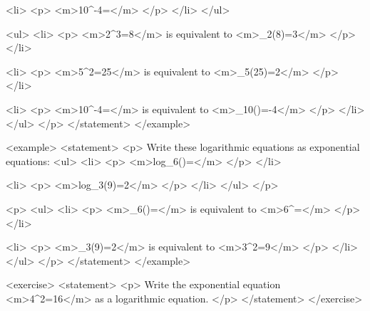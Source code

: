                         <li>
                            <p>
                                <m>10^{-4}=</m>
                            </p>
                        </li>
                    </ul>

                    <ul>
                        <li>
                            <p>
                                <m>2^{3}=8</m> is equivalent to <m>\log_{2}⁡(8)=3</m>
                            </p>
                        </li>

                        <li>
                            <p>
                                <m>5^{2}=25</m> is equivalent to <m>\log_{5}⁡(25)=2</m>
                            </p>
                        </li>

                        <li>
                            <p>
                                <m>10^{-4}=</m> is equivalent to <m>\log_{10}⁡()=-4</m>
                            </p>
                        </li>
                    </ul>
                </p>
            </statement>
        </example>

        <example>
            <statement>
                <p>
                    Write these logarithmic equations as exponential equations:
                    <ul>
                        <li>
                            <p>
                                <m>log_{6}⁡()=</m>
                            </p>
                        </li>

                        <li>
                            <p>
                                <m>log_{3}⁡(9)=2</m>
                            </p>
                        </li>
                    </ul>
                </p>

                <p>
                    <ul>
                        <li>
                            <p>
                                <m>\log_{6}⁡()=</m> is equivalent to <m>6^{}=</m>
                            </p>
                        </li>

                        <li>
                            <p>
                                <m>\log_{3}⁡(9)=2</m> is equivalent to <m>3^{2}=9</m>
                            </p>
                        </li>
                    </ul>
                </p>
            </statement>
        </example>

        <exercise>
            <statement>
                <p>
                    Write the exponential equation <m>4^{2}=16</m> as a logarithmic equation.
                </p>
            </statement>
        </exercise>

